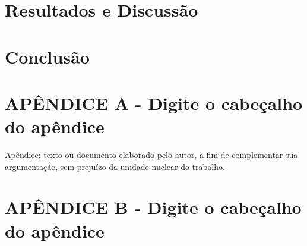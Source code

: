 \documentclass[
	12pt,				%
	openright,			%
	oneside,			%
	a4paper,			%
	brazil				%
	]{abntex2}
\begin{document}
\chapter{Resultados e Discussão}


\chapter{Conclusão}






\postextual


\begin{apendicesenv}

\partapendices

\chapter*{\normalsize APÊNDICE A - Digite o cabeçalho do apêndice}

Apêndice: texto ou documento elaborado pelo autor, a fim de complementar sua argumentação, sem prejuízo da unidade nuclear do trabalho.

\chapter*{\normalsize APÊNDICE B - Digite o cabeçalho do apêndice}

\end{apendicesenv}
\end{document}
